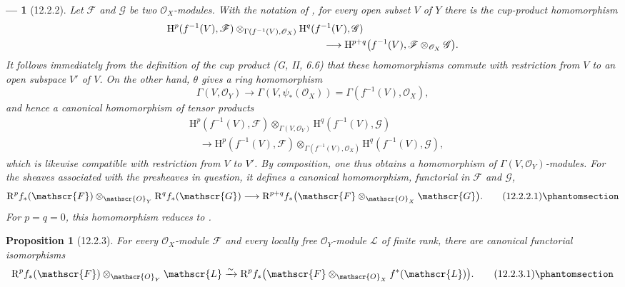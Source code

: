 \documentclass[oneside]{amsart}
\theoremstyle{ega-env-style}
\newtheorem*{env}{---}
\theoremstyle{ega-thm-env-style}
\newtheorem*{proposition}{Proposition}
\theoremstyle{ega-defn-env-style}
\def\mathcal{\mathscr}
\def\sh{\mathcal}                   %
\def\HH{\mathrm{H}}                 %
\def\RR{\mathrm{R}}                 %
\def\simto{\xrightarrow{\sim}}
\newcommand{\oldpage}[2][]{{\marginnote{\normalfont{\textbf{#1}~|~#2}}}\ignorespaces}
\let\EGAOriginalLabel\label
\renewcommand{\label}[1]{\phantomsection\EGAOriginalLabel{#1}}
\begin{document}
\begin{env}[12.2.2]
\label{0.12.2.2}
Let $\sh{F}$ and $\sh{G}$ be two $\sh{O}_X$-modules.
With the notation of , for every open subset $V$ of
$Y$ there is the cup-product homomorphism 
\[
  \begin{aligned}
  &\HH^p(f^{-1}(V),\sh{F})
    \otimes_{\Gamma(f^{-1}(V),\sh{O}_X)}
    \HH^q(f^{-1}(V),\sh{G})\\
  &\hspace{55mm}\longrightarrow
    \HH^{p+q}\bigl(f^{-1}(V),
      \sh{F}\otimes_{\sh{O}_X}\sh{G}\bigr).
  \end{aligned}
\]
\oldpage[0\textsubscript{III}]{58}
It follows immediately from the definition of the cup product
(G, II, 6.6) that these homomorphisms commute with restriction from
$V$ to an open subspace $V'$ of $V$.
On the other hand, $\theta$ gives a ring homomorphism
\[
  \Gamma(V,\sh{O}_Y)
  \longrightarrow\Gamma(V,\psi_*(\sh{O}_X))
  =\Gamma(f^{-1}(V),\sh{O}_X),
\]
and hence a canonical homomorphism of tensor products
\[
  \begin{aligned}
  &\HH^p(f^{-1}(V),\sh{F})
    \otimes_{\Gamma(V,\sh{O}_Y)}
    \HH^q(f^{-1}(V),\sh{G})\\
  &\quad\longrightarrow
    \HH^p(f^{-1}(V),\sh{F})
    \otimes_{\Gamma(f^{-1}(V),\sh{O}_X)}
    \HH^q(f^{-1}(V),\sh{G}),
  \end{aligned}
\]
which is likewise compatible with restriction from $V$ to $V'$.
By composition, one thus obtains a homomorphism of
$\Gamma(V,\sh{O}_Y)$-modules.  For the sheaves associated with the
presheaves in question, it defines a canonical homomorphism,
functorial in $\sh{F}$ and $\sh{G}$,
\[
  \RR^p f_*(\sh{F})\otimes_{\sh{O}_Y}\RR^q f_*(\sh{G})
  \longrightarrow
  \RR^{p+q}f_*
    \bigl(\sh{F}\otimes_{\sh{O}_X}\sh{G}\bigr).
  \tag{12.2.2.1}
  \label{0.12.2.2.1}
\]
For $p=q=0$, this homomorphism reduces to
.
\end{env}

\begin{proposition}[12.2.3]
\label{0.12.2.3}
For every $\sh{O}_X$-module $\sh{F}$ and every locally free
$\sh{O}_Y$-module $\sh{L}$ of finite rank, there are canonical
functorial isomorphisms
\[
  \RR^p f_*(\sh{F})\otimes_{\sh{O}_Y}\sh{L}
  \simto
  \RR^p f_*
    \bigl(\sh{F}\otimes_{\sh{O}_X}f^*(\sh{L})\bigr).
  \tag{12.2.3.1}
  \label{0.12.2.3.1}
\]
\end{proposition}
\end{document}
